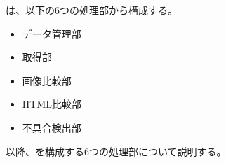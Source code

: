 \toolName は、以下の6つの処理部から構成する。
\begin{itemize}
    \item データ管理部
    \item 取得部
    \item 画像比較部
    \item HTML比較部
    \item 不具合検出部
\end{itemize}
以降、\toolName を構成する6つの処理部について説明する。
\par

